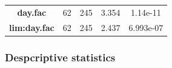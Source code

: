 \documentclass[]{article}
\begin{document}
\begin{longtable}[]{@{}ccccc@{}}
\begin{minipage}[t]{0.21\columnwidth}
\textbf{day.fac}
\strut\end{minipage} &
\begin{minipage}[t]{0.10\columnwidth}\centering\strut
62
\strut\end{minipage} &
\begin{minipage}[t]{0.10\columnwidth}\centering\strut
245
\strut\end{minipage} &
\begin{minipage}[t]{0.12\columnwidth}\centering\strut
3.354
\strut\end{minipage} &
\begin{minipage}[t]{0.12\columnwidth}\centering\strut
1.14e-11
\strut\end{minipage}\tabularnewline
\begin{minipage}[t]{0.21\columnwidth}\centering\strut
\textbf{lim:day.fac}
\strut\end{minipage} &
\begin{minipage}[t]{0.10\columnwidth}\centering\strut
62
\strut\end{minipage} &
\begin{minipage}[t]{0.10\columnwidth}\centering\strut
245
\strut\end{minipage} &
\begin{minipage}[t]{0.12\columnwidth}\centering\strut
2.437
\strut\end{minipage} &
\begin{minipage}[t]{0.12\columnwidth}\centering\strut
6.993e-07
\strut\end{minipage}\tabularnewline
\bottomrule
\end{longtable}

\newpage

\subsubsection{Despcriptive statistics}\label{despcriptive-statistics}
\end{document}
